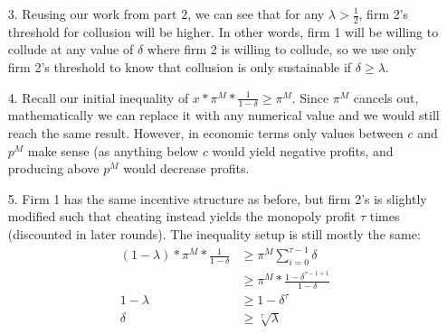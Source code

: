 \documentclass[12pt,letterpaper]{article}
\begin{document}
\begin{enumerate}
\begin{enumerate}
	\item[3.] Reusing our work from part 2, we can see that for any $\lambda > \frac{1}{2}$, firm 2's threshold for collusion will be higher. In other words, firm 1 will be willing to collude at any value of $\delta$ where firm 2 is willing to collude, so we use only firm 2's threshold to know that collusion is only sustainable if $\delta \geq \lambda$. 
	\item[4.] Recall our initial inequality of $x * \pi^M * \frac{1}{1-\delta} \geq \pi^M$. Since $\pi^M$ cancels out, mathematically we can replace it with any numerical value and we would still reach the same result. However, in economic terms only values between $c$ and $p^M$ make sense (as anything below $c$ would yield negative profits, and producing above $p^M$ would decrease profits.
	\item[5.] Firm 1 has the same incentive structure as before, but firm 2's is slightly modified such that  cheating instead yields the monopoly profit $\tau$ times (discounted in later rounds). The inequality setup is still mostly the same:
	\begin{align*}
		(1-\lambda) * \pi^M * \frac{1}{1-\delta} &\geq \pi^M \sum_{i=0}^{\tau-1} \delta \\
		&\geq \pi^M * \frac{1 - \delta^{\tau-1+1}}{1-\delta} \\
		1-\lambda &\geq 1 - \delta^\tau \\
		\delta &\geq \sqrt[\tau]{\lambda}
	\end{align*}   
\end{enumerate} 


\end{enumerate}
	
\end{document}
